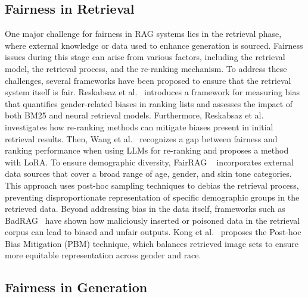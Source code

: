 \subsection{Fairness in Retrieval}
One major challenge for fairness in RAG systems lies in the retrieval phase, where external knowledge or data used to enhance generation is sourced. Fairness issues during this stage can arise from various factors, including the retrieval model, the retrieval process, and the re-ranking mechanism. 
To address these challenges, several frameworks have been proposed to ensure that the retrieval system itself is fair.
Reskabsaz et al.~\cite{rekabsaz2020neural} introduces a framework for measuring bias that quantifies gender-related biases in ranking lists and assesses the impact of both BM25 and neural retrieval models. Furthermore, Reskabsaz et al.~\cite{rekabsaz2021societal} investigates how re-ranking methods can mitigate biases present in initial retrieval results. Then, Wang et al.~\cite{wang2024large} recognizes a gap between fairness and ranking performance when using LLMs for re-ranking and proposes a method with LoRA. To ensure demographic diversity, FairRAG ~\cite{shrestha2024fairrag} incorporates external data sources that cover a broad range of age, gender, and skin tone categories. This approach uses post-hoc sampling techniques to debias the retrieval process, preventing disproportionate representation of specific demographic groups in the retrieved data.
Beyond addressing bias in the data itself, frameworks such as BadRAG~\cite{xue2024badrag} have shown how maliciously inserted or poisoned data in the retrieval corpus can lead to biased and unfair outputs. Kong et al.~\cite{kong2024mitigating} proposes the Post-hoc Bias Mitigation (PBM) technique, which balances retrieved image sets to ensure more equitable representation across gender and race.



\subsection{Fairness in Generation}

